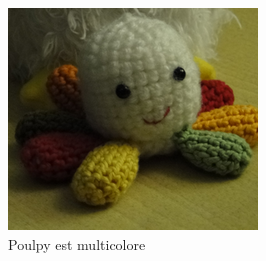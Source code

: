 \documentclass{article}
\begin{document}
\begin{figure}
\begin{center}
 \includegraphics{poulpy.png} 
\end{center}
 \caption{Poulpy est multicolore}
 \label{Poulpy est multicolore}

\end{figure}

\clearpage %
\cleardoublepage
\end{document}
